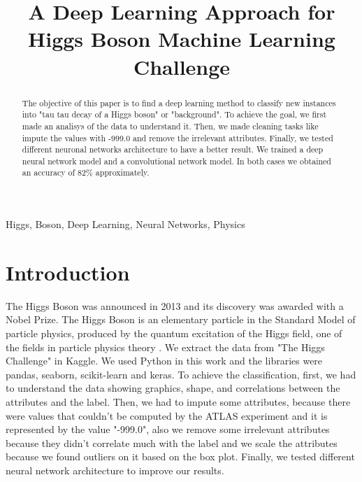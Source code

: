 \documentclass[conference]{IEEEtran}
\begin{document}
\title{A Deep Learning Approach for Higgs Boson Machine Learning Challenge\\
}

\author{
\and
{}
}


\maketitle

\begin{abstract}
The objective of this paper is to find a deep learning method to classify new instances into "tau tau decay of a Higgs boson" or "background". To achieve the goal, we first made an analisys of the data to understand it. Then, we made cleaning tasks like impute the values with -999.0 and remove the irrelevant attributes. Finally, we tested different neuronal networks architecture to have a better result. We trained a deep neural network model and a convolutional network model. In both cases we obtained an accuracy of 82\% approximately.
\end{abstract}

\begin{IEEEkeywords}
Higgs, Boson, Deep Learning, Neural Networks, Physics
\end{IEEEkeywords}

\section{Introduction}
The Higgs Boson was announced in 2013 and its discovery was awarded with a Nobel Prize. The Higgs Boson is an elementary particle in the Standard Model of particle physics, produced by the quantum excitation of the Higgs field, one of the fields in particle physics theory \cite{b1}.
We extract the data from "The Higgs Challenge" in Kaggle\cite{b2}.\newline
We used Python in this work and the libraries were pandas, seaborn, scikit-learn and keras.\newline
To achieve the classification, first, we had to understand the data showing graphics, shape, and correlations between the attributes and the label. Then, we had to impute some attributes, because there were values that couldn't be computed by the ATLAS experiment and it is represented by the value "-999.0", also we remove some irrelevant attributes because they didn't correlate much with the label and we scale the attributes because we found outliers on it based on the box plot. Finally, we tested different neural network architecture to improve our results.
\end{document}
